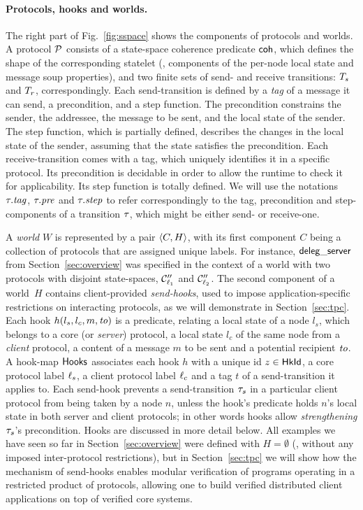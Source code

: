\paragraph{Protocols, hooks and worlds.}
\label{sec:protocols-worlds}

The right part of Fig.~\ref{fig:sspace} shows the components of \disel
protocols and worlds. A protocol $\mathcal{P}$ consists of a state-space
coherence predicate $\mathsf{coh}$, which defines the shape of the
corresponding statelet (\ie, components of the per-node local state
and message soup properties), and two finite sets of send- and receive
transitions: $T_s$ and $T_r$, correspondingly.
%
Each send-transition is defined by a \emph{tag} of a message it can
send, a precondition, and a step function. The precondition constrains
the sender, the addressee, the message to be sent, and the local state
of the sender.
%
The step function, which is partially defined, describes the changes
in the local state of the sender, assuming that the state satisfies
the precondition.
%
Each receive-transition comes with a tag, which uniquely identifies it
in a specific protocol. Its precondition is decidable in order to
allow the runtime to check it for applicability. Its
step function is totally defined.
%
We will use the notations $\tau.\mathit{tag}$, $\tau.\mathit{pre}$ and
$\tau.\mathit{step}$ to refer correspondingly to the tag, precondition and
step-components of a transition $\tau$, which might be either send-
or receive-one.

A \emph{world} $W$ is represented by a pair $\langle{C, H}\rangle$, with its
first component $C$ being a collection of protocols that are assigned
unique labels. For instance, $\mathsf{deleg\_server}$ from
Section~\ref{sec:overview} was specified in the context of a world
with two protocols with disjoint state-spaces, $\mathcal{C}''_{\ell_1}$ and
$\mathcal{C}''_{\ell_2}$.
%
The second component of a world~$H$ contains client-provided
\emph{send-hooks}, used to impose application-specific restrictions on
interacting protocols, as we will demonstrate in
Section~\ref{sec:tpc}.
%
Each hook $h(l_s, l_c, m, \mathit{to})$ is a predicate,
relating a local state of a node $l_s$, which belongs to a core (or
\emph{server}) protocol, a local state $l_c$ of the same node from a
\emph{client} protocol, a content of a message $m$ to be sent and a
potential recipient $\mathit{to}$. A hook-map $\mathsf{Hooks}$ associates each hook
$h$ with a unique id $z \in \mathsf{HkId}$, a core protocol label $\ell_s$, a
client protocol label $\ell_c$ and a tag $t$ of a send-transition it
applies to. Each send-hook prevents a send-transition $\tau_s$ in a
particular client protocol from being taken by a node $n$, unless the
hook's predicate holds \wrt $n$'s local state in both server and
client protocols; in other words hooks allow \emph{strengthening}
$\tau_s$'s precondition.  Hooks are discussed in more detail below.
%
All examples we have seen so far in Section~\ref{sec:overview} were
defined with $H = \emptyset$ (\ie, without any imposed inter-protocol
restrictions), but in Section~\ref{sec:tpc} we will show how the
mechanism of send-hooks enables modular verification of programs
operating in a restricted product of protocols, allowing one to build
verified distributed client applications on top of verified core
systems.

